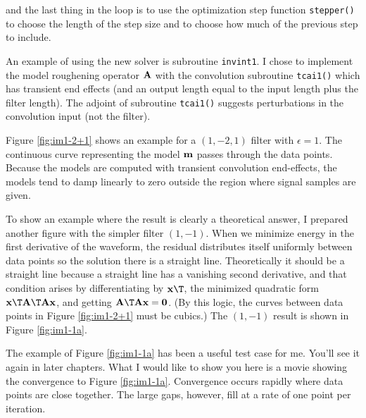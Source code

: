 and the last thing in the loop is to use
the optimization step function \texttt{stepper()} 
to choose the length of the step size
and to choose how much of the previous step to include.
\par
An example of using the new solver is subroutine \texttt{invint1}.
I chose to implement the model roughening operator $\bold A$
with the convolution subroutine \texttt{tcai1()}
which has transient end effects
(and an output length equal to the input length plus the filter length).
The adjoint of subroutine {\tt tcai1()} suggests perturbations
in the convolution input (not the filter).
\par
Figure \ref{fig:im1-2+1} shows an example for a $(1,-2,1)$ filter with $\epsilon = 1$.
The continuous curve representing the model $\bold m$
passes through the data points.
Because the models are computed with transient convolution end-effects,
the models tend to damp linearly to zero outside the region where
signal samples are given.
\par
To show an example where the result is clearly a theoretical answer,
I prepared another figure with the simpler filter $(1,-1)$.
When we minimize energy in the first derivative of the waveform,
the residual distributes itself uniformly
between data points
so the solution there is a straight line.
Theoretically it should be a straight line
because a straight line has a vanishing second derivative,
and that condition arises by differentiating by $\bold x\T$,
the minimized quadratic form
$\bold x\T \bold A\T\bold A \bold x$, and getting
$         \bold A\T\bold A \bold x=\bold 0$.
(By this logic, the curves between data points in Figure \ref{fig:im1-2+1}
must be cubics.)
The $(1,-1)$ result is shown in Figure \ref{fig:im1-1a}.
\par
The example of
Figure \ref{fig:im1-1a}
has been a useful test case for me.
You'll see it again in later chapters.
What I would like to show you here is a movie showing the convergence
to Figure \ref{fig:im1-1a}.
Convergence occurs rapidly where data points are close together.
The large gaps, however, fill at a rate of one point per iteration.

